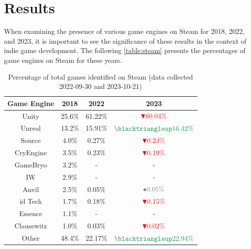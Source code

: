 \section{Results}
When examining the presence of various game engines on Steam for 2018, 2022, and 2023, it is important to see the significance of these results in the context of indie game development.
The following \autoref{table:steam} presents the percentages of game engines on Steam for these years.

\begin{table}[ht!]
    \centering
    \begin{tabular}{|c c c c|}
        \hline
        Game Engine & 2018   & 2022    & 2023    \\
        \hline\hline
        Unity       & 25.6\% & 61.22\% & $\textcolor{red}{\blacktriangledown 60.04\%}$  \\
        Unreal      & 13.2\% & 15.91\% & $\textcolor{ForestGreen}{\blacktriangleup 16.42\%}$  \\
        Source      & 4.0\%  & 0.27\%  & $\textcolor{red}{\blacktriangledown 0.23\%}$   \\
        CryEngine   & 3.5\%  & 0.23\%  & $\textcolor{red}{\blacktriangledown 0.19\%}$   \\
        GameBryo    & 3.2\%  & -       & -       \\
        IW          & 2.9\%  & -       & -       \\
        Anvil       & 2.5\%  & 0.05\%  & $\textcolor{gray}{\bullet 0.05\%}$   \\
        id Tech     & 1.7\%  & 0.18\%  & $\textcolor{red}{\blacktriangledown 0.15\%}$   \\
        Essence     & 1.1\%  & -       & -       \\
        Clausewitz  & 1.0\%  & 0.03\%  & $\textcolor{red}{\blacktriangledown 0.02\% }$  \\
        Other       & 48.4\% & 22.17\% & $\textcolor{ForestGreen}{\blacktriangleup 22.94\%}$  \\
        \hline
    \end{tabular}
    \caption{Percentage of total games identified on Steam (data collected 2022-09-30 and 2023-10-21)}
    \label{table:steam}
\end{table}

